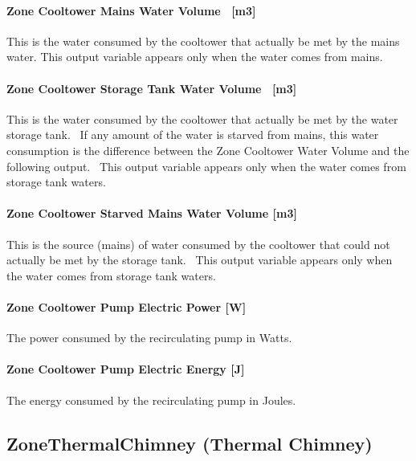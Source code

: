 \paragraph{Zone Cooltower Mains Water Volume ~{[}m3{]}}\label{zone-cooltower-mains-water-volume-m3}

This is the water consumed by the cooltower that actually be met by the mains water. This output variable appears only when the water comes from mains.

\paragraph{Zone Cooltower Storage Tank Water Volume ~{[}m3{]}}\label{zone-cooltower-storage-tank-water-volume-m3}

This is the water consumed by the cooltower that actually be met by the water storage tank.~ If any amount of the water is starved from mains, this water consumption is the difference between the Zone Cooltower Water Volume and the following output.~ This output variable appears only when the water comes from storage tank waters.

\paragraph{Zone Cooltower Starved Mains Water Volume {[}m3{]}}\label{zone-cooltower-starved-mains-water-volume-m3}

This is the source (mains) of water consumed by the cooltower that could not actually be met by the storage tank. ~This output variable appears only when the water comes from storage tank waters.

\paragraph{Zone Cooltower Pump Electric Power {[}W{]}}\label{zone-cooltower-pump-electric-power-w}

The power consumed by the recirculating pump in Watts.

\paragraph{Zone Cooltower Pump Electric Energy {[}J{]}}\label{zone-cooltower-pump-electric-energy-j}

The energy consumed by the recirculating pump in Joules.

\subsection{ZoneThermalChimney (Thermal Chimney)}\label{zonethermalchimney-thermal-chimney}

